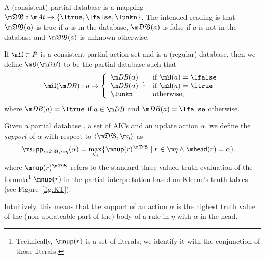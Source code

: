 A (consistent) partial database is a mapping $\tdb: \atoms \to \{\ltrue,\lfalse,\lunkn\}$.
The intended reading is that $\tdb(a)$ is true if $a$ is in the database, $\tdb(a)$ is false if $a$ is not in the database and $\tdb(a)$ is unknown otherwise. 

If $\UUU \in P$ is a consistent partial action set and \db is a (regular) database, then we define $\UUU(\db)$ to be the partial database such that 
\[ \UUU(\db): a \mapsto \left \{\begin{array}{ll}
                                 \db(a) & \text{if }\UUU(a) = \lfalse\\
                                 \db(a)^{-1} & \text{if }\UUU(a) = \ltrue\\
                                 \lunkn & \text{otherwise,}
                                \end{array}\right.
                                \]
where $\db(a) = \ltrue$ if $a\in \db$ and $\db(a)=\lfalse$ otherwise. 



\begin{definition}\label{def:support}
Given a partial database \tdb, a set of AICs \aics and an update action $\alpha$,  we define the \emph{support} of $\alpha$ with respect to $\langle \tdb, \aics\rangle$ as 
\begin{align*}
 \supp_{\tdb,\aics}(\alpha) &= \max_{\leq_t}\{\nup(r)^{\tdb}\mid r\in \aics \land \head(r) = \alpha\},
\end{align*}
where $\nup(r)^{\tdb}$ refers to the standard three-valued truth evaluation of the formula\footnote{Technically, $\nup(r)$ is a set of literals; we identify it with the conjunction of those literals.} $\nup(r)$ in the partial interpretation \tdb based on Kleene's truth tables \cite{Kleene38} (see Figure~\ref{fig:KT}).
\end{definition}
Intuitively, this means that the support of an action $\alpha$ is the highest truth value of the (non-updateable part of the) body of a rule in $\eta$ with $\alpha$ in the head. 




